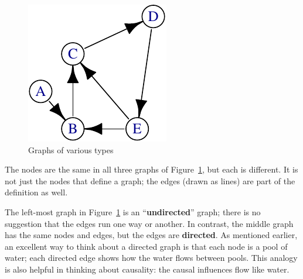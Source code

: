 \documentclass[
  letterpaper,
  DIV=11,
  numbers=noendperiod,
  oneside]{scrartcl}
\begin{document}
\begin{tcolorbox}
\begin{figure}[H]
\begin{minipage}{0.33\linewidth}
{\includegraphics{test-tufte_files/figure-pdf/fig-graphs-2.pdf}

}


\end{minipage}%
%
\begin{minipage}{0.33\linewidth}



\end{minipage}%

\caption{\label{fig-graphs}Graphs of various types}

\end{figure}%

The nodes are the same in all three graphs of Figure~\ref{fig-graphs},
but each is different. It is not just the nodes that define a graph; the
edges (drawn as lines) are part of the definition as well.

The left-most graph in Figure~\ref{fig-graphs} is an
``\textbf{undirected}'' graph; there is no suggestion that the edges run
one way or another. In contrast, the middle graph has the same nodes and
edges, but the edges are \textbf{directed}. As mentioned earlier, an
excellent way to think about a directed graph is that each node is a
pool of water; each directed edge shows how the water flows between
pools. This analogy is also helpful in thinking about causality: the
causal influences flow like water.


\end{tcolorbox}
\end{document}
